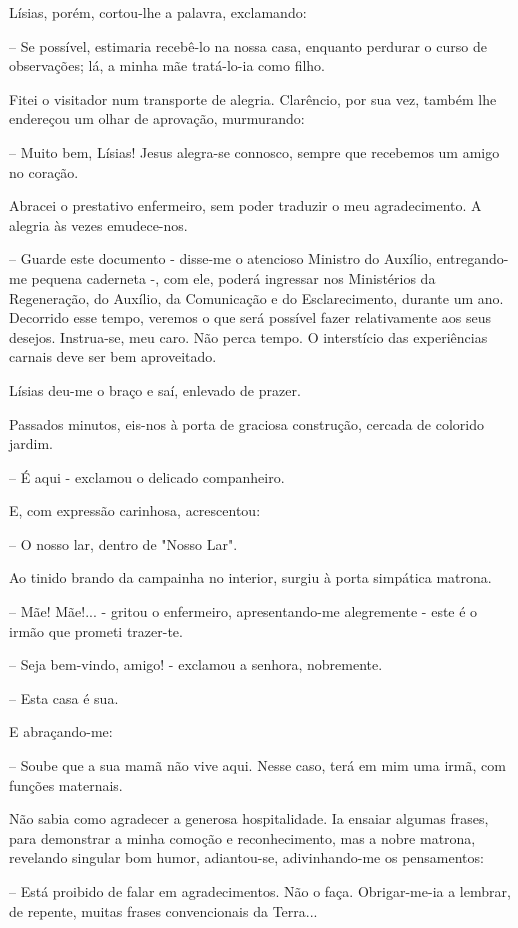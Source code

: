 \documentclass[portuguese,12pt,a4paper]{scrbook}
\begin{document}
	Lísias, porém, cortou-lhe a palavra, exclamando:
	
	– Se possível, estimaria recebê-lo na nossa casa, enquanto perdurar o curso de observações; lá, a minha mãe tratá-lo-ia como filho.
	
	Fitei o visitador num transporte de alegria. Clarêncio, por sua vez, também lhe endereçou um olhar de aprovação, murmurando:
	
	
	– Muito bem, Lísias! Jesus alegra-se connosco, sempre que recebemos um amigo no coração.
	
	Abracei o prestativo enfermeiro, sem poder traduzir o meu agradecimento. A alegria às vezes emudece-nos.
	
	– Guarde este documento - disse-me o atencioso Ministro do Auxílio, entregando-me pequena caderneta -, com ele, poderá ingressar nos Ministérios da Regeneração, do Auxílio, da Comunicação e do Esclarecimento, durante um ano. Decorrido esse tempo, veremos o que será possível fazer relativamente aos seus desejos. Instrua-se, meu caro. Não perca tempo. O interstício das experiências carnais deve ser bem aproveitado.
	
	Lísias deu-me o braço e saí, enlevado de prazer.
	
	Passados minutos, eis-nos à porta de graciosa construção, cercada de colorido jardim.
	
	– É aqui - exclamou o delicado companheiro.
	
	E, com expressão carinhosa, acrescentou:
	
	– O nosso lar, dentro de "Nosso Lar".
	
	Ao tinido brando da campainha no interior, surgiu à porta simpática matrona.
	
	– Mãe! Mãe!... - gritou o enfermeiro, apresentando-me alegremente - este é o irmão que prometi trazer-te.
	
	– Seja bem-vindo, amigo! - exclamou a senhora, nobremente.
	
	– Esta casa é sua.
	
	E abraçando-me:
	
	– Soube que a sua mamã não vive aqui. Nesse caso, terá em mim uma irmã, com funções maternais.
	
	Não sabia como agradecer a generosa hospitalidade. Ia ensaiar algumas frases, para demonstrar a minha comoção e reconhecimento, mas a nobre matrona, revelando singular bom humor, adiantou-se, adivinhando-me os pensamentos:
	
	– Está proibido de falar em agradecimentos. Não o faça. Obrigar-me-ia a lembrar, de repente, muitas frases convencionais da Terra...
	
\end{document}

